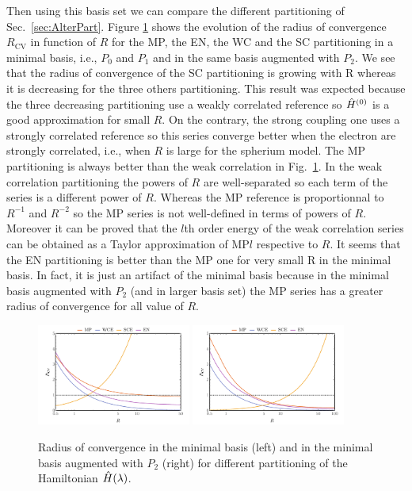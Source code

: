 \documentclass[11pt,a4paper]{article}
\newcommand{\hH}{\Hat{H}}
\begin{document}
Then using this basis set we can compare the different partitioning of Sec.~\ref{sec:AlterPart}. Figure \ref{fig:RadiusPartitioning} shows the evolution of the radius of convergence $R_{\text{CV}}$ in function of $R$ for the MP, the EN, the WC and the SC partitioning in a minimal basis, i.e., $P_0$ and $P_1$ and in the same basis augmented with $P_2$. We see that the radius of convergence of the SC partitioning is growing with R whereas it is decreasing for the three others partitioning. This result was expected because the three decreasing partitioning use a weakly correlated reference so $\hH^{(0)}$ is a good approximation for small $R$. On the contrary, the strong coupling one uses a strongly correlated reference so this series converge better when the electron are strongly correlated, i.e., when $R$ is large for the spherium model.
The MP partitioning is always better than the weak correlation in Fig.~\ref{fig:RadiusPartitioning}. In the weak correlation partitioning the powers of $R$ are well-separated so each term of the series is a different power of $R$. Whereas the MP reference is proportionnal to $R^{-1}$ and $R^{-2}$ so the MP series is not well-defined in terms of powers of $R$. Moreover it can be proved that the $l$th order energy of the weak correlation series can be obtained as a Taylor approximation of MP$l$ respective to $R$. It seems that the EN partitioning is better than the MP one for very small R in the minimal basis. In fact, it is just an artifact of the minimal basis because in the minimal basis augmented with $P_2$ (and in larger basis set) the MP series has a greater radius of convergence for all value of $R$.

\begin{figure}[h!]
    \centering
    \includegraphics[width=0.45\textwidth]{PartitioningRCV2.pdf}
    \includegraphics[width=0.45\textwidth]{PartitioningRCV3.pdf}
    \caption{\centering Radius of convergence in the minimal basis (left) and in the minimal basis augmented with $P_2$ (right) for different partitioning of the Hamiltonian $\hH(\lambda)$.}
    \label{fig:RadiusPartitioning}
\end{figure}
\end{document}
